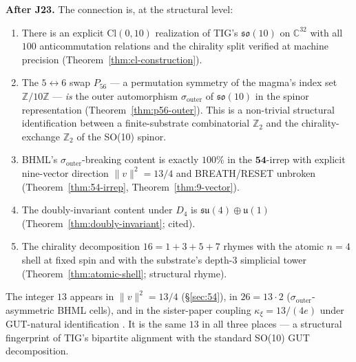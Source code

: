 \documentclass[11pt,reqno]{amsart}
\theoremstyle{definition}
\newcommand{\Z}{\mathbb{Z}}
\newcommand{\C}{\mathbb{C}}
\newcommand{\so}{\mathfrak{so}}
\newcommand{\su}{\mathfrak{su}}
\newcommand{\uone}{\mathfrak{u}}
\newcommand{\Cl}{\mathrm{Cl}}
\newcommand{\Psix}{P_{56}}
\newcommand{\sout}{\sigma_{\mathrm{outer}}}
\begin{document}
\textbf{After J23.} The connection is, at the structural level:

\begin{enumerate}[leftmargin=*]
\item There is an explicit $\Cl(0, 10)$ realization of TIG's
$\so(10)$ on $\C^{32}$ with all $100$ anticommutation relations and
the chirality split verified at machine precision
(Theorem~\ref{thm:cl-construction}).
\item The $5\!\leftrightarrow\!6$ swap $\Psix$ — a permutation
symmetry of the magma's index set $\Z/10\Z$ — \emph{is} the outer
automorphism $\sout$ of $\so(10)$ in the spinor representation
(Theorem~\ref{thm:p56-outer}). This is a non-trivial structural
identification between a finite-substrate combinatorial $\Z_2$ and
the chirality-exchange $\Z_2$ of the SO(10) spinor.
\item BHML's $\sout$-breaking content is exactly $100\%$ in the
$\mathbf{54}$-irrep with explicit nine-vector direction
$\|v\|^2 = 13/4$ and BREATH/RESET unbroken
(Theorem~\ref{thm:54-irrep}, Theorem~\ref{thm:9-vector}).
\item The doubly-invariant content under $D_4$ is $\su(4) \oplus
\uone(1)$ (Theorem~\ref{thm:doubly-invariant}; cited).
\item The chirality decomposition $16 = 1+3+5+7$ rhymes with the
atomic $n=4$ shell at fixed spin and with the substrate's
depth-$3$ simplicial tower (Theorem~\ref{thm:atomic-shell};
structural rhyme).
\end{enumerate}

The integer $13$ appears in $\|v\|^2 = 13/4$ (\S\ref{sec:54}), in
$26 = 13 \cdot 2$ ($\sout$-asymmetric BHML cells), and in the
sister-paper coupling $\kappa_\xi = 13/(4e)$ under GUT-natural
identification \cite{Sanders2026Atlas}. It is the same $13$ in
all three places — a structural fingerprint of TIG's bipartite
alignment with the standard SO(10) GUT decomposition.
\end{document}
